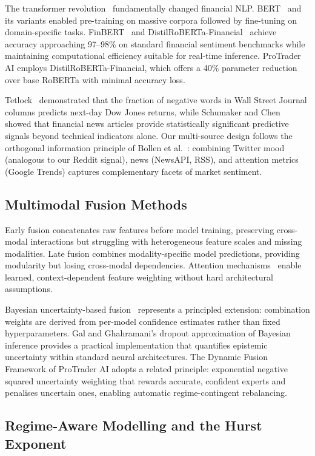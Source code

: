\documentclass[10pt,a4paper,twoside]{article}
\begin{document}
The transformer revolution~\cite{vaswani2017} fundamentally changed financial
NLP. BERT~\cite{devlin2019} and its variants enabled pre-training on massive
corpora followed by fine-tuning on domain-specific tasks. FinBERT~\cite{araci2019}
and DistilRoBERTa-Financial~\cite{liu2019} achieve accuracy approaching
97--98\% on standard financial sentiment benchmarks while maintaining
computational efficiency suitable for real-time inference. ProTrader AI employs
DistilRoBERTa-Financial, which offers a 40\% parameter reduction over base
RoBERTa with minimal accuracy loss.

Tetlock~\cite{tetlock2007} demonstrated that the fraction of negative words in
Wall Street Journal columns predicts next-day Dow Jones returns, while
Schumaker and Chen~\cite{schumaker2009} showed that financial news articles
provide statistically significant predictive signals beyond technical indicators
alone. Our multi-source design follows the orthogonal information principle of
Bollen et al.~\cite{bollen2011}: combining Twitter mood (analogous to our Reddit
signal), news (NewsAPI, RSS), and attention metrics (Google Trends) captures
complementary facets of market sentiment.

\subsection{Multimodal Fusion Methods}

Early fusion concatenates raw features before model training, preserving
cross-modal interactions but struggling with heterogeneous feature scales and
missing modalities. Late fusion combines modality-specific model
predictions, providing modularity but losing cross-modal dependencies. Attention
mechanisms~\cite{vaswani2017} enable learned, context-dependent feature
weighting without hard architectural assumptions.

Bayesian uncertainty-based fusion~\cite{gal2016} represents a principled
extension: combination weights are derived from per-model confidence estimates
rather than fixed hyperparameters. Gal and Ghahramani's dropout approximation
of Bayesian inference provides a practical implementation that quantifies
epistemic uncertainty within standard neural architectures. The Dynamic Fusion
Framework of ProTrader AI adopts a related principle: exponential negative
squared uncertainty weighting that rewards accurate, confident experts and
penalises uncertain ones, enabling automatic regime-contingent rebalancing.

\subsection{Regime-Aware Modelling and the Hurst Exponent}
\end{document}
